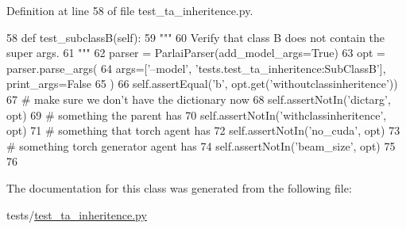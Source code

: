 Definition at line 58 of file test\+\_\+ta\+\_\+inheritence.\+py.


\begin{DoxyCode}
58     \textcolor{keyword}{def }test\_subclassB(self):
59         \textcolor{stringliteral}{"""}
60 \textcolor{stringliteral}{        Verify that class B does not contain the super args.}
61 \textcolor{stringliteral}{        """}
62         parser = ParlaiParser(add\_model\_args=\textcolor{keyword}{True})
63         opt = parser.parse\_args(
64             args=[\textcolor{stringliteral}{'--model'}, \textcolor{stringliteral}{'tests.test\_ta\_inheritence:SubClassB'}], print\_args=\textcolor{keyword}{False}
65         )
66         self.assertEqual(\textcolor{stringliteral}{'b'}, opt.get(\textcolor{stringliteral}{'withoutclassinheritence'}))
67         \textcolor{comment}{# make sure we don't have the dictionary now}
68         self.assertNotIn(\textcolor{stringliteral}{'dictarg'}, opt)
69         \textcolor{comment}{# something the parent has}
70         self.assertNotIn(\textcolor{stringliteral}{'withclassinheritence'}, opt)
71         \textcolor{comment}{# something that torch agent has}
72         self.assertNotIn(\textcolor{stringliteral}{'no\_cuda'}, opt)
73         \textcolor{comment}{# something torch generator agent has}
74         self.assertNotIn(\textcolor{stringliteral}{'beam\_size'}, opt)
75 
76 
\end{DoxyCode}


The documentation for this class was generated from the following file\+:\begin{DoxyCompactItemize}
\item 
tests/\hyperlink{test__ta__inheritence_8py}{test\+\_\+ta\+\_\+inheritence.\+py}\end{DoxyCompactItemize}
